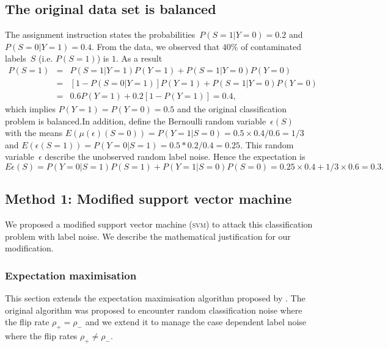 \documentclass{article} %
\begin{document}
\subsection{The original data set is balanced} \label{sec:1}
The assignment instruction states the probabilities~$P(S=1|Y=0)=0.2$ and $P(S=0|Y=1)=0.4$. From the data, we observed that $40\%$ of contaminated labels~$S$ (i.e. $P(S=1)$) is $1$. As a result
\begin{eqnarray*}
P(S=1)&=&P(S=1|Y=1)P(Y=1)+P(S=1|Y=0)P(Y=0)\\
     &=&\left[1-P(S=0|Y=1)\right]P(Y=1)+P(S=1|Y=0)P(Y=0)\\
     &=&0.6P(Y=1)+0.2\left[1-P(Y=1)\right]=0.4, \nonumber
\end{eqnarray*}
which implies $P(Y=1)=P(Y=0)=0.5$ and the original classification problem is balanced.In addition, define the Bernoulli random variable~$\epsilon(S)$ with the means $E(\mu(\epsilon)(S=0))=P(Y=1|S=0)=0.5\times0.4/0.6=1/3$ and $E(\epsilon(S=1))=P(Y=0|S=1)=0.5*0.2/0.4=0.25$. This random variable~$\epsilon$ describe the unobserved random label noise. Hence the expectation is
\begin{equation}
    E\epsilon(S)=P(Y=0|S=1)P(S=1)+P(Y=1|S=0)P(S=0)=0.25\times 0.4+1/3\times0.6=0.3.\label{eq:exp}
\end{equation}
\subsection{Method 1: Modified support vector machine}
We proposed a modified support vector machine (\textsc{svm}) to attack this classification problem with label noise. We describe the mathematical justification for our modification.
\subsubsection{Expectation maximisation}
This section extends the expectation maximisation algorithm proposed by \citet{pmlr-v20-biggio11}. The original algorithm was proposed to encounter random classification noise where the flip rate $\rho_+=\rho_-$ and we extend it to manage the case dependent label noise where the flip rates $\rho_+\neq\rho_-$.
\end{document}
